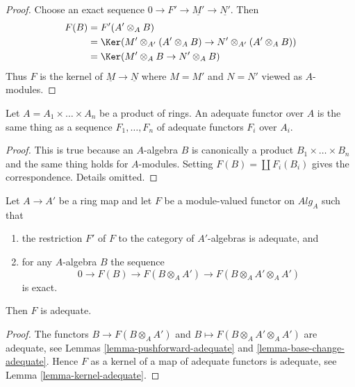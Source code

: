 \begin{proof}
Choose an exact sequence $0 \to F' \to \underline{M'} \to \underline{N'}$.
Then
\begin{align*}
F(B) & = F'(A' \otimes_A B) \\
& = \Ker(M' \otimes_{A'} (
A' \otimes_A B) \to N' \otimes_{A'} (A' \otimes_A B)) \\
& = \Ker(M' \otimes_A B \to N' \otimes_A B)
\end{align*}
Thus $F$ is the kernel of
$\underline{M} \to \underline{N}$
where $M = M'$ and $N = N'$ viewed as $A$-modules.
\end{proof}

\begin{lemma}
\label{lemma-adequate-product}
Let $A = A_1 \times \ldots \times A_n$ be a product of rings.
An adequate functor over $A$ is the same thing as a sequence
$F_1, \ldots, F_n$ of adequate functors $F_i$ over $A_i$.
\end{lemma}

\begin{proof}
This is true because an $A$-algebra $B$ is canonically a product
$B_1 \times \ldots \times B_n$ and the same thing holds for $A$-modules.
Setting $F(B) = \coprod F_i(B_i)$ gives the correspondence.
Details omitted.
\end{proof}

\begin{lemma}
\label{lemma-adequate-descent}
Let $A \to A'$ be a ring map and let $F$ be a module-valued functor on
$\textit{Alg}_A$ such that
\begin{enumerate}
\item the restriction $F'$ of $F$ to the category of $A'$-algebras is
adequate, and
\item for any $A$-algebra $B$ the sequence
$$
0 \to F(B) \to F(B \otimes_A A') \to F(B \otimes_A A' \otimes_A A')
$$
is exact.
\end{enumerate}
Then $F$ is adequate.
\end{lemma}

\begin{proof}
The functors $B \to F(B \otimes_A A')$ and
$B \mapsto F(B \otimes_A A' \otimes_A A')$ are adequate, see
Lemmas \ref{lemma-pushforward-adequate} and
\ref{lemma-base-change-adequate}.
Hence $F$ as a kernel of a map of adequate functors is adequate, see
Lemma \ref{lemma-kernel-adequate}.
\end{proof}






